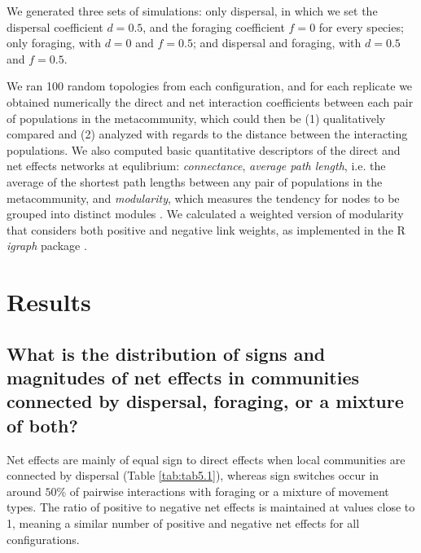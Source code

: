 We generated three sets of simulations: only dispersal, in which we set the dispersal coefficient $d = 0.5$, and the foraging coefficient $f = 0$ for every species; only foraging, with $d = 0$ and $f = 0.5$; and dispersal and foraging, with $d = 0.5$ and $f = 0.5$.

We ran 100 random topologies from each configuration, and for each replicate we obtained numerically the direct and net interaction coefficients between each pair of populations in the metacommunity, which could then be (1) qualitatively compared and (2) analyzed with regards to the distance between the interacting populations. We also computed basic quantitative descriptors of the direct and net effects networks at equlibrium: \textit{connectance}, \textit{average path length}, i.e. the average of the shortest path lengths between any pair of populations in the metacommunity, and \textit{modularity}, which measures the tendency for nodes to be grouped into distinct modules \citep{Newman2006}. We calculated a weighted version of modularity that considers both positive and negative link weights, as implemented in the R \textit{igraph} package \citep{Csardi2006}.

\section{Results}

\subsection*{What is the distribution of signs and magnitudes of net effects in communities connected by dispersal, foraging, or a mixture of both?}

Net effects are mainly of equal sign to direct effects when local communities are connected by dispersal (Table \ref{tab:tab5.1}), whereas sign switches occur in around $50\%$ of pairwise interactions with foraging or a mixture of movement types. The ratio of positive to negative net effects is maintained at values close to 1, meaning a similar number of positive and negative net effects for all configurations.

